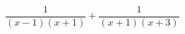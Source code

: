 \hspace*{2mm}\begin{minipage}[t]{\dimexpr\linewidth-2mm\relax}\vspace{0pt}
$\dfrac{1}{(x-1)(x+1)}+\dfrac{1}{(x+1)(x+3)}$\end{minipage}
